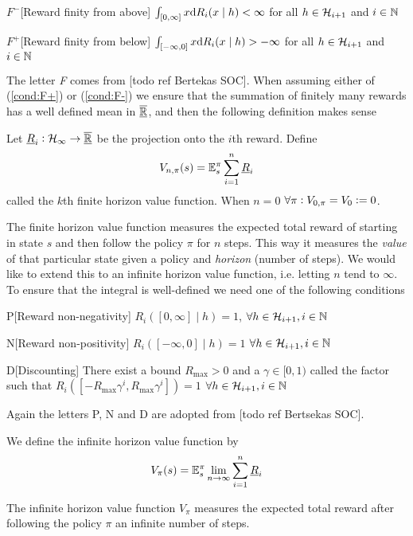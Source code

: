 \begin{cond}{$F^-$}[Reward finity from above]
  $\int_{[0,\infty]} x \mathrm{d} R_i(x \mid h) < \infty$ for all
  $h \in \mathcal{H}_{i+1}$ and $i \in \mathbb{N}$
  \label{cond:F-}
\end{cond}
\begin{cond}{$F^+$}[Reward finity from below]
  $\int_{[-\infty,0]} x \mathrm{d} R_i(x \mid h) > -\infty$ for all
  $h \in \mathcal{H}_{i+1}$ and $i \in \mathbb{N}$
  \label{cond:F+}
\end{cond}
The letter \emph{F} comes from [todo ref Bertekas SOC].
When assuming either of (\cref{cond:F+}) or (\cref{cond:F-})
we ensure that the summation of finitely many rewards
has a well defined mean in $\overline{\underline{\mathbb{R}}}$,
and then the following definition makes sense 
\begin{defn}
  Let $\underline{R}_i : \mathcal{H}_\infty \to \overline{\underline{\mathbb{R}}}$ be the projection onto the
  $i$th reward. Define
  \[ V_{n,\pi}(s) = \mathbb{E}_s^\pi \sum_{i=1}^n \underline{R}_i \]
  called the $k$th finite horizon value function.
  When $n=0$ $\forall \pi : V_{0,\pi} = V_0 \vcentcolon= 0$.
\end{defn}
The finite horizon value function
measures the expected total reward of starting in state $s$
and then follow the policy $\pi$ for $n$ steps.
This way it measures the \emph{value} of that particular state
given a policy and \emph{horizon} (number of steps).
We would like to extend this to an infinite horizon value function,
i.e. letting $n$ tend to $\infty$. To ensure that the integral is well-defined
we need one of the following conditions
\begin{cond}{P}[Reward non-negativity] $R_i([0,\infty] \mid h) = 1$,
  $\forall h \in \mathcal{H}_{i+1}, i \in \mathbb{N}$
  \label{cond:P}
\end{cond}
\begin{cond}{N}[Reward non-positivity] $R_i([-\infty, 0] \mid h) = 1$
  $\forall h \in \mathcal{H}_{i+1}, i \in \mathbb{N}$
  \label{cond:N} 
\end{cond}
\begin{cond}{D}[Discounting] There exist a bound $R_{\max} > 0$ and a
  $\gamma \in [0,1)$ called the  factor such that
  $R_i([-R_{\max} \gamma^i, R_{\max} \gamma^i]) = 1$
  $\forall h \in \mathcal{H}_{i+1}, i \in \mathbb{N}$
  \label{cond:D}
\end{cond}
Again the letters P, N and D are adopted from [todo ref Bertsekas SOC].
\begin{defn}
  We define the infinite horizon value function by
  \[ V_\pi(s) = \mathbb{E}_s^\pi \lim_{n \to \infty} \sum_{i=1}^n \underline{R}_i \]
\end{defn}
The infinite horizon value function $V_\pi$ measures the expected total
reward after following the policy $\pi$ an infinite number of steps.


